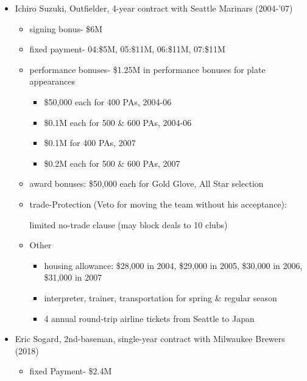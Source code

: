 \documentclass[dvipdfmx, 12pt]{article}
\begin{document}
\begin{table}
  \centering
  \small
  \caption{Descriptions of the Contract of the Specific Players}
  \label{Incentive_Contracts}
  \begin{itemize}
    \item Ichiro Suzuki, Outfielder, 4-year contract with Seattle Marinars (2004-'07)
    \begin{itemize}
      \item signing bonus- \$6M

      \item fixed payment- 04:\$5M, 05:\$11M, 06:\$11M, 07:\$11M

      \item performance bonuses- \$1.25M in performance bonuses for plate appearances

      \begin{itemize}
        \item \$50,000 each for 400 PAs, 2004-06

        \item \$0.1M each for 500 \& 600 PAs, 2004-06

        \item \$0.1M for 400 PAs, 2007

        \item \$0.2M each for 500 \& 600 PAs, 2007
      \end{itemize}

      \item award bonuses: \$50,000 each for Gold Glove, All Star selection

      \item trade-Protection (Veto for moving the team without his acceptance):

      limited no-trade clause (may block deals to 10 clubs)

      \item Other

      \begin{itemize}
        \item housing allowance: \$28,000 in 2004, \$29,000 in 2005, \$30,000 in 2006, \$31,000 in 2007

        \item interpreter, trainer, transportation for spring \& regular season

        \item 4 annual round-trip airline tickets from Seattle to Japan
      \end{itemize}
    \end{itemize}
  \end{itemize}
  \begin{itemize}
    \item Eric Sogard, 2nd-baseman, single-year contract with Milwaukee Brewers (2018)
    \begin{itemize}
      \item fixed Payment- \$2.4M


\end{itemize}
\end{itemize}
\end{table}
\end{document}
